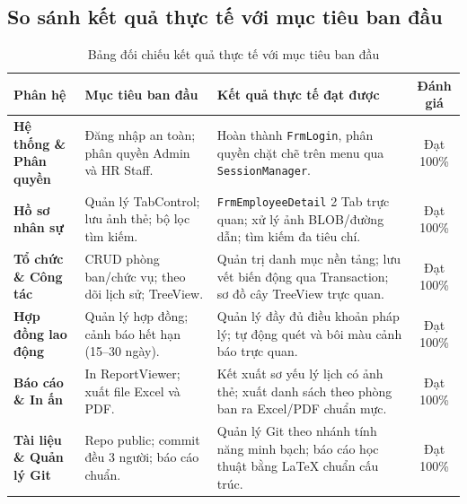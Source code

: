 \documentclass[12pt,a4paper]{report}
\begin{document}
\subsection{So sánh kết quả thực tế với mục tiêu ban đầu}

\begin{table}[htbp]
\centering
\small
\begin{tabularx}{\textwidth}{|p{3.5cm}|p{4.0cm}|p{5.5cm}|c|}
\hline
\textbf{Phân hệ} & \textbf{Mục tiêu ban đầu} & \textbf{Kết quả thực tế đạt được} & \textbf{Đánh giá} \\ \hline
\textbf{Hệ thống \& Phân quyền} & Đăng nhập an toàn; phân quyền Admin và HR Staff. & Hoàn thành \texttt{FrmLogin}, phân quyền chặt chẽ trên menu qua \texttt{SessionManager}. & Đạt 100\% \\ \hline
\textbf{Hồ sơ nhân sự} & Quản lý TabControl; lưu ảnh thẻ; bộ lọc tìm kiếm. & \texttt{FrmEmployeeDetail} 2 Tab trực quan; xử lý ảnh BLOB/đường dẫn; tìm kiếm đa tiêu chí. & Đạt 100\% \\ \hline
\textbf{Tổ chức \& Công tác} & CRUD phòng ban/chức vụ; theo dõi lịch sử; TreeView. & Quản trị danh mục nền tảng; lưu vết biến động qua Transaction; sơ đồ cây TreeView trực quan. & Đạt 100\% \\ \hline
\textbf{Hợp đồng lao động} & Quản lý hợp đồng; cảnh báo hết hạn (15--30 ngày). & Quản lý đầy đủ điều khoản pháp lý; tự động quét và bôi màu cảnh báo trực quan. & Đạt 100\% \\ \hline
\textbf{Báo cáo \& In ấn} & In ReportViewer; xuất file Excel và PDF. & Kết xuất sơ yếu lý lịch có ảnh thẻ; xuất danh sách theo phòng ban ra Excel/PDF chuẩn mực. & Đạt 100\% \\ \hline
\textbf{Tài liệu \& Quản lý Git} & Repo public; commit đều 3 người; báo cáo chuẩn. & Quản lý Git theo nhánh tính năng minh bạch; báo cáo học thuật bằng LaTeX chuẩn cấu trúc. & Đạt 100\% \\ \hline
\end{tabularx}
\caption{Bảng đối chiếu kết quả thực tế với mục tiêu ban đầu}
\end{table}
\end{document}

